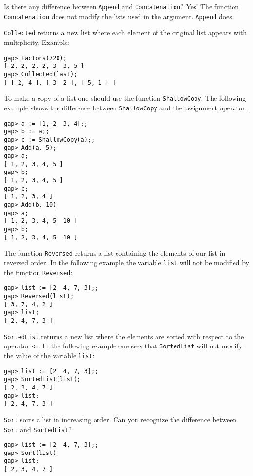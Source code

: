 \begin{remark}
  Is there any difference between \lstinline{Append} and
  \lstinline{Concatenation}? Yes!  The function \lstinline{Concatenation} does
  not modify the lists used in the argument. \lstinline{Append} does.
\end{remark}


\lstinline{Collected} returns a new list where each element 
of the original list appears with multiplicity. 
Example: 
\begin{lstlisting}
gap> Factors(720);
[ 2, 2, 2, 2, 3, 3, 5 ]
gap> Collected(last);
[ [ 2, 4 ], [ 3, 2 ], [ 5, 1 ] ]
\end{lstlisting}

To make a copy of a list one should use the function \lstinline{ShallowCopy}.
The following example shows the difference between \lstinline{ShallowCopy} and
the assignment operator. 
\begin{lstlisting}
gap> a := [1, 2, 3, 4];;
gap> b := a;;
gap> c := ShallowCopy(a);;
gap> Add(a, 5);
gap> a;
[ 1, 2, 3, 4, 5 ]
gap> b;
[ 1, 2, 3, 4, 5 ]
gap> c;
[ 1, 2, 3, 4 ]
gap> Add(b, 10);
gap> a;
[ 1, 2, 3, 4, 5, 10 ]
gap> b;
[ 1, 2, 3, 4, 5, 10 ]
\end{lstlisting}

The function \lstinline{Reversed} returns a list
containing the elements of our list in reversed order. 
In the following example 
the variable \lstinline{list} will not be modified by the function \lstinline{Reversed}:
\begin{lstlisting}
gap> list := [2, 4, 7, 3];;
gap> Reversed(list);
[ 3, 7, 4, 2 ]
gap> list;
[ 2, 4, 7, 3 ]
\end{lstlisting}
\lstinline{SortedList} returns a new list where the elements are sorted with
respect to the operator \lstinline{<=}. In the following example one sees that
\lstinline{SortedList} will not modify the value of the variable
\lstinline{list}:
\begin{lstlisting}
gap> list := [2, 4, 7, 3];;
gap> SortedList(list);
[ 2, 3, 4, 7 ]
gap> list;
[ 2, 4, 7, 3 ]
\end{lstlisting}
\lstinline{Sort} sorts a list in increasing order. Can you recognize the
difference between \lstinline{Sort} and \lstinline{SortedList}?
\begin{lstlisting}
gap> list := [2, 4, 7, 3];;
gap> Sort(list);
gap> list;
[ 2, 3, 4, 7 ]
\end{lstlisting}

